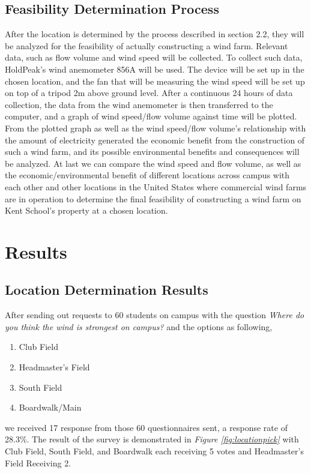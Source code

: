 \documentclass[review]{elsarticle}
\begin{document}
\subsection{Feasibility Determination Process}
\label{sec:methods:feasdeterprocess}
After the location is determined by the process described in section 2.2, they will be analyzed for the feasibility of actually constructing 
a wind farm. Relevant data, such as flow volume and wind speed will be collected. To collect such data, HoldPeak's wind anemometer 856A will 
be used. The device will be set up in the chosen location, and the fan that will be measuring the wind speed will be set up on top of a tripod 
2m above ground level. After a continuous 24 hours of data collection, the data from the wind anemometer is then transferred to the computer, 
and a graph of wind speed/flow volume against time will be plotted.
\\\indent From the plotted graph as well as the wind speed/flow volume's relationship with the amount of electricity generated the economic 
benefit from the construction of such a wind farm, and its possible environmental benefits and consequences will be analyzed. At last we can 
compare the wind speed and flow volume, as well as the economic/environmental benefit of different locations across campus with each other 
and other locations in the United States where commercial wind farms are in operation to determine the final feasibility of constructing a 
wind farm on Kent School's property at a chosen location.



\section{Results}
\label{sec:results}
\subsection{Location Determination Results}
\label{sec:results:locdeterresults}
After sending out requests to 60 students on campus with the question \textit{Where do you think the wind is strongest on campus?} and the options as following,
\begin{enumerate}
    \item {Club Field}
    \item {Headmaster's Field}
    \item {South Field}
    \item {Boardwalk/Main}   
\end{enumerate}
we received 17 response from those 60 questionnaires sent, a response rate of 28.3\%. The result of the survey is demonstrated in 
\textit{Figure \ref{fig:locationpick}} with Club Field, South Field, and Boardwalk each receiving 5 votes and Headmaster's Field Receiving 2.
\end{document}
